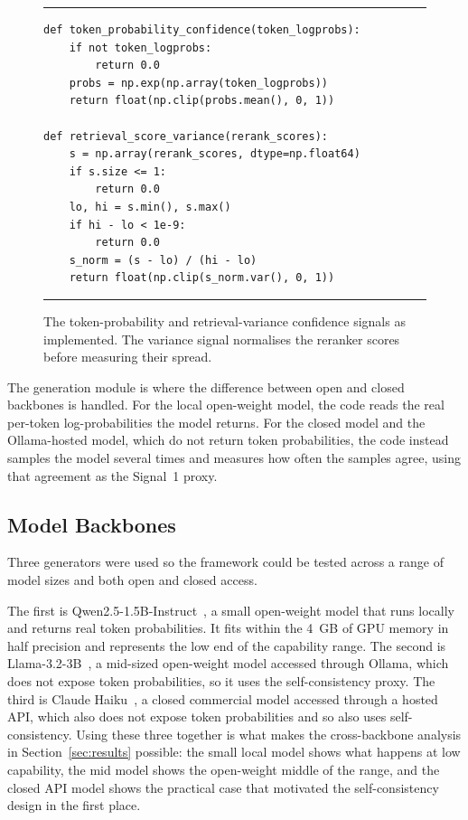 \documentclass[conference,a4paper,10pt]{IEEEtran}
\begin{document}
\begin{figure}[t]
\begin{footnotesize}
\hrule\vspace{3pt}
\begin{verbatim}
def token_probability_confidence(token_logprobs):
    if not token_logprobs:
        return 0.0
    probs = np.exp(np.array(token_logprobs))
    return float(np.clip(probs.mean(), 0, 1))

def retrieval_score_variance(rerank_scores):
    s = np.array(rerank_scores, dtype=np.float64)
    if s.size <= 1:
        return 0.0
    lo, hi = s.min(), s.max()
    if hi - lo < 1e-9:
        return 0.0
    s_norm = (s - lo) / (hi - lo)
    return float(np.clip(s_norm.var(), 0, 1))
\end{verbatim}
\vspace{1pt}\hrule
\end{footnotesize}
\caption{The token-probability and retrieval-variance confidence signals as implemented.
The variance signal normalises the reranker scores before measuring their spread.}
\label{fig:code}
\end{figure}

The generation module is where the difference between open and closed backbones is
handled. For the local open-weight model, the code reads the real per-token
log-probabilities the model returns. For the closed model and the Ollama-hosted model,
which do not return token probabilities, the code instead samples the model several times
and measures how often the samples agree, using that agreement as the Signal~1 proxy.

\subsection{Model Backbones}
Three generators were used so the framework could be tested across a range of model sizes
and both open and closed access.

The first is Qwen2.5-1.5B-Instruct~\cite{yang2024qwen}, a small open-weight model that
runs locally and returns real token probabilities. It fits within the 4~GB of GPU memory
in half precision and represents the low end of the capability range. The second is
Llama-3.2-3B~\cite{dubey2024llama}, a mid-sized open-weight model accessed through Ollama,
which does not expose token probabilities, so it uses the self-consistency proxy. The
third is Claude Haiku~\cite{anthropic2024claude}, a closed commercial model accessed
through a hosted API, which also does not expose token probabilities and so also uses
self-consistency. Using these three together is what makes the cross-backbone analysis in
Section~\ref{sec:results} possible: the small local model shows what happens at low
capability, the mid model shows the open-weight middle of the range, and the closed API
model shows the practical case that motivated the self-consistency design in the first
place.
\end{document}
